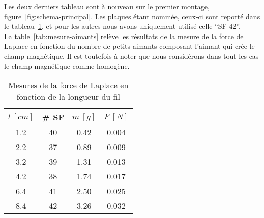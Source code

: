 \documentclass[11pt]{article}
\begin{document}
    Les deux derniers tableau sont à nouveau sur le premier montage, figure~\ref{fig:schema-principal}.
    Les plaques étant nommée, ceux-ci sont reporté dans le tableau~\ref{tab:mesure-longueur}, et pour
    les autres nous avons uniquement utilisé celle ``SF 42''.\\
    La table~\ref{tab:mesure-aimants} relève les résultats de la mesure de la force de Laplace en fonction
    du nombre de petits aimants composant l'aimant qui crée le champ magnétique.
    Il est toutefois à noter que nous considérons dans tout les cas le champ magnétique comme homogène.

    \begin{minipage}{.45\textwidth}
        \begin{table}[H]
            \centering

            \begin{tabular}{|c|c|c|c|}
                \hline
                \rowcolor{gray} $l \ [cm]$ & \# SF & $m \ [g]$ & $F \ [N]$ \\
                \hline
                1.2 & 40 & 0.42 & 0.004 \\
                \hline
                2.2 & 37 & 0.89 & 0.009 \\
                \hline
                3.2 & 39 & 1.31 & 0.013 \\
                \hline
                4.2 & 38 & 1.74 & 0.017 \\
                \hline
                6.4 & 41 & 2.50 & 0.025 \\
                \hline
                8.4 & 42 & 3.26 & 0.032 \\
                \hline
            \end{tabular}
            \caption{Mesures de la force de Laplace en fonction de la longueur du fil}
            \label{tab:mesure-longueur}
        \end{table}
    \end{minipage}
    \hfill
\end{document}
